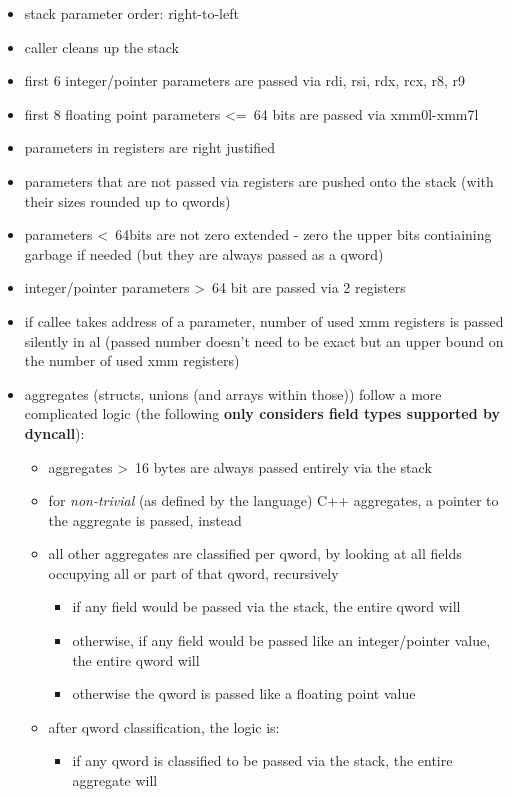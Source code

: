 \begin{itemize}
\item stack parameter order: right-to-left
\item caller cleans up the stack
\item first 6 integer/pointer parameters are passed via rdi, rsi, rdx, rcx, r8, r9
\item first 8 floating point parameters \textless=\ 64 bits are passed via xmm0l-xmm7l
\item parameters in registers are right justified
\item parameters that are not passed via registers are pushed onto the stack (with their sizes rounded up to qwords)
\item parameters \textless\ 64bits are not zero extended - zero the upper bits contiaining garbage if needed (but they are always
passed as a qword)
\item integer/pointer parameters \textgreater\ 64 bit are passed via 2 registers
\item if callee takes address of a parameter, number of used xmm registers is passed silently in al (passed number doesn't need to be
exact but an upper bound on the number of used xmm registers)
\item aggregates (structs, unions (and arrays within those)) follow a more complicated logic (the following {\bf only considers field types supported by dyncall}):
\begin{itemize}
  \item aggregates \textgreater\ 16 bytes are always passed entirely via the stack
  \item for {\it non-trivial} (as defined by the language) C++ aggregates, a pointer to the aggregate is passed, instead
  \item all other aggregates are classified per qword, by looking at all fields occupying all or part of that qword, recursively
  \begin{itemize}
    \item if any field would be passed via the stack, the entire qword will
    \item otherwise, if any field would be passed like an integer/pointer value, the entire qword will
    \item otherwise the qword is passed like a floating point value
  \end{itemize}
  \item after qword classification, the logic is:
  \begin{itemize}
    \item if any qword is classified to be passed via the stack, the entire aggregate will

\end{itemize}
\end{itemize}
\end{itemize}
